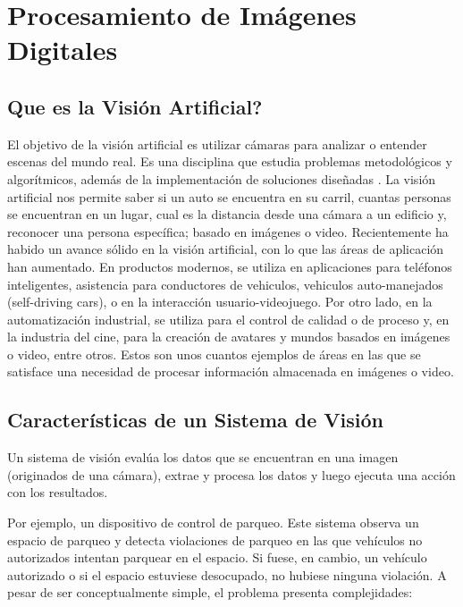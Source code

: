 \chapter{Procesamiento de Imágenes Digitales}

\section{Que es la Visión Artificial?}
El objetivo de la visión artificial es utilizar cámaras para analizar o entender escenas del mundo real. Es una disciplina que estudia problemas metodológicos y algorítmicos, además de la implementación de soluciones diseñadas \parencite{Klette2014-oo}.
La visión artificial nos permite saber si un auto se encuentra en su carril, cuantas personas se encuentran en un lugar, cual es la distancia desde una cámara a un edificio y, reconocer una persona específica; basado en imágenes o video.
Recientemente ha habido un avance sólido en la visión artificial, con lo que las áreas de aplicación han aumentado. En productos modernos, se utiliza en aplicaciones para teléfonos inteligentes, asistencia para conductores de vehiculos, vehiculos auto-manejados (self-driving cars), o en la interacción usuario-videojuego.  Por otro lado, en la automatización industrial, se utiliza para el control de calidad o de proceso y, en la industria del cine, para la creación de avatares y mundos basados en imágenes o video, entre otros.  Estos son unos cuantos ejemplos de áreas en las que se satisface una necesidad de procesar información almacenada en imágenes o video. 


\section{Características de un Sistema de Visión}
Un sistema de visión evalúa los datos que se encuentran en una imagen (originados de una cámara), extrae y procesa los datos y luego ejecuta una acción con los resultados.

Por ejemplo, un dispositivo de control de parqueo. Este sistema observa un espacio de parqueo y detecta violaciones de parqueo en las que vehículos no autorizados intentan parquear en el espacio. Si fuese, en cambio, un vehículo autorizado o si el espacio estuviese desocupado, no hubiese ninguna violación. A pesar de ser conceptualmente simple, el problema presenta complejidades:

